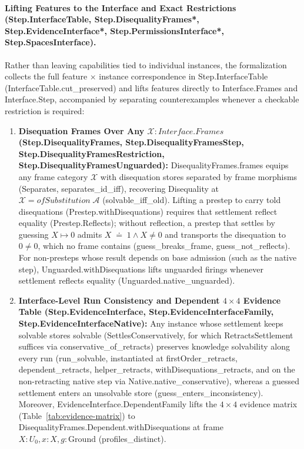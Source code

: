 \documentclass[11pt,a4paper]{article}
\theoremstyle{definition}
\DeclareRobustCommand{\lean}[1]{%
  \ifmmode\text{\normalfont\ttfamily\footnotesize\detokenize{#1}}%
  \else{\normalfont\footnotesize\leanurl{#1}}\fi}
\def\lean#1{#1}%
\newcommand{\doteqStore}{\;\doteq\;}
\begin{document}
\paragraph{Lifting Features to the Interface and Exact Restrictions (\lean{Step.InterfaceTable}, \lean{Step.DisequalityFrames*}, \lean{Step.EvidenceInterface*}, \lean{Step.PermissionsInterface*}, \lean{Step.SpacesInterface}).}
Rather than leaving capabilities tied to individual instances, the formalization collects the full feature $\times$ instance correspondence in \lean{Step.InterfaceTable} (\lean{InterfaceTable.cut_preserved}) and lifts features directly to \lean{Interface.Frames} and \lean{Interface.Step}, accompanied by separating counterexamples whenever a checkable restriction is required:
\begin{enumerate}[leftmargin=2em, nosep]
  \item \textbf{Disequation Frames Over Any $\mathcal{X} : \lean{Interface.Frames}$ (\lean{Step.DisequalityFrames}, \lean{Step.DisequalityFramesStep}, \lean{Step.DisequalityFramesRestriction}, \lean{Step.DisequalityFramesUnguarded}):}
  \lean{DisequalityFrames.frames} equips any frame category $\mathcal{X}$ with disequation stores separated by frame morphisms (\lean{Separates}, \lean{separates_id_iff}), recovering \lean{Disequality} at $\mathcal{X} = \lean{ofSubstitution}\;\mathcal{A}$ (\lean{solvable_iff_old}). Lifting a prestep to carry told disequations (\lean{Prestep.withDisequations}) requires that settlement reflect equality (\lean{Prestep.Reflects}); without reflection, a prestep that settles by guessing $X \mapsto 0$ admits $X \doteqStore 1 \land X \neq 0$ and transports the disequation to $0 \neq 0$, which no frame contains (\lean{guess_breaks_frame}, \lean{guess_not_reflects}). For non-presteps whose result depends on base admission (such as the native step), \lean{Unguarded.withDisequations} lifts unguarded firings whenever settlement reflects equality (\lean{Unguarded.native_unguarded}).
  \item \textbf{Interface-Level Run Consistency and Dependent $4 \times 4$ Evidence Table (\lean{Step.EvidenceInterface}, \lean{Step.EvidenceInterfaceFamily}, \lean{Step.EvidenceInterfaceNative}):}
  Any instance whose settlement keeps solvable stores solvable (\lean{SettlesConservatively}, for which \lean{RetractsSettlement} suffices via \lean{conservative_of_retracts}) preserves knowledge solvability along every run (\lean{run_solvable}, instantiated at \lean{firstOrder_retracts}, \lean{dependent_retracts}, \lean{helper_retracts}, \lean{withDisequations_retracts}, and on the non-retracting native step via \lean{Native.native_conservative}), whereas a guessed settlement enters an unsolvable store (\lean{guess_enters_inconsistency}). Moreover, \lean{EvidenceInterface.DependentFamily} lifts the $4 \times 4$ evidence matrix (Table~\ref{tab:evidence-matrix}) to \lean{DisequalityFrames.Dependent.withDisequations} at frame $X : U_0, x : X, g : \mathrm{Ground}$ (\lean{profiles_distinct}).

\end{enumerate}
\end{document}
